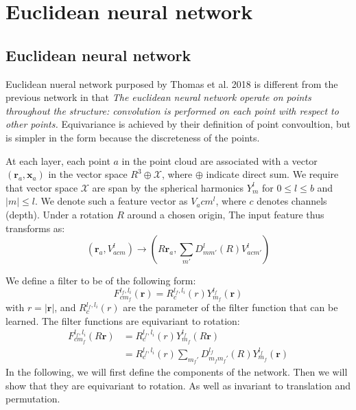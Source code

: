 \documentclass{IEEEtran}
\begin{document}
\section{Euclidean neural network}
\subsection{Euclidean neural network}

Euclidean nueral network purposed by Thomas et al. 2018\cite{thomas_tensor_2018} is different from the previous network in that
\emph{The euclidean neural network operate on points throughout the structure: convolution is performed on each point with respect to other points.}
Equivariance is achieved by their definition of point convoultion, but is simpler in the form because the discreteness of the 
points.

At each layer, each point $a$ in the point cloud are associated with a vector $(\mathbf{r}_a, \mathbf{x}_a)$ 
in the vector space $R^3 \oplus \mathcal{X}$, where $\oplus$ indicate direct sum. We require that vector space $\mathcal{X}$ are span 
by the spherical harmonics $Y_m^l$ for $0\leq l \leq b$ and $|m|\leq l$. We denote such a feature 
vector as $V_acm^l$, where $c$ denotes channels (depth). 
Under a rotation $R$ around a chosen origin, The input feature thus transforms as:
\begin{equation}
    (\mathbf{r}_{a}, V_{acm}^l) \to (R \mathbf{r}_{a}, \sum_{m'}D_{mm'}^l(R)V_{acm'}^l) \label{E:3dnn_rotation_input}
\end{equation}

We define a filter to be of the following form:
\begin{equation}
    F_{cm_f}^{l_f, l_i}(\mathbf{r}) =  R_c^{l_f, l_i} (r) Y_{m_f}^{l_f}(\mathbf{r})
\end{equation}
with $r = |\mathbf{r}|$, and $R_c^{l_f, l_i} (r)$ are the parameter of the filter function that can be learned.
The filter functions are equivariant to rotation:
\begin{align}
    F_{cm_f}^{l_f, l_i}(R\mathbf{r}) &= R_c^{l_f, l_i} (r) Y_{m_f}^{l_f}(R\mathbf{r}) \\
    &= R_c^{l_f, l_i} (r) \sum_{m_f'} D_{m_fm_f'}^{l_f}(R)  Y_{m_f}^{l_f}(\mathbf{r})
\end{align}
In the following, we will first define the components of the network.
Then we will show that they are equivariant to rotation. As well as 
invariant to translation and permutation.
\end{document}
